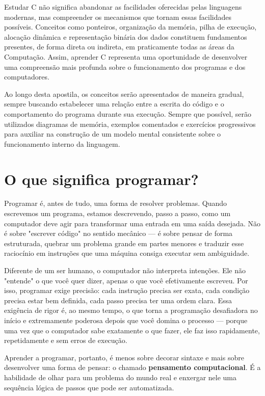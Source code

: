 \documentclass[12pt,a4paper,oneside]{extreport}
\begin{document}
Estudar C não significa abandonar as facilidades oferecidas pelas linguagens modernas, mas compreender os mecanismos que tornam essas facilidades possíveis. 
Conceitos como ponteiros, organização da memória, pilha de execução, alocação dinâmica e 
representação binária dos dados constituem fundamentos presentes, de forma direta ou indireta, em praticamente todas as áreas da Computação. 
Assim, aprender C representa uma oportunidade de desenvolver uma compreensão mais profunda sobre o funcionamento dos programas e dos computadores.

Ao longo desta apostila, os conceitos serão apresentados de maneira gradual, sempre buscando estabelecer uma relação entre a escrita do código e o comportamento do programa durante sua execução. 
Sempre que possível, serão utilizados diagramas de memória, exemplos comentados e exercícios progressivos para auxiliar na construção de um modelo mental consistente sobre o funcionamento interno da linguagem.


\section{O que significa programar?}

Programar é, antes de tudo, uma forma de resolver problemas. Quando escrevemos um programa, estamos descrevendo, passo a passo, como um computador deve agir para transformar uma entrada em uma saída desejada. Não é sobre "escrever código" no sentido mecânico — é sobre pensar de forma estruturada, quebrar um problema grande em partes menores e traduzir esse raciocínio em instruções que uma máquina consiga executar sem ambiguidade.

Diferente de um ser humano, o computador não interpreta intenções. Ele não "entende" o que você quer dizer, apenas o que você efetivamente escreveu. Por isso, programar exige precisão: cada instrução precisa ser exata, cada condição precisa estar bem definida, cada passo precisa ter uma ordem clara. Essa exigência de rigor é, ao mesmo tempo, o que torna a programação desafiadora no início e extremamente poderosa depois que você domina o processo — porque uma vez que o computador sabe exatamente o que fazer, ele faz isso rapidamente, repetidamente e sem erros de execução.

Aprender a programar, portanto, é menos sobre decorar sintaxe e mais sobre desenvolver uma forma de pensar: o chamado \textbf{pensamento computacional}. É a habilidade de olhar para um problema do mundo real e enxergar nele uma sequência lógica de passos que pode ser automatizada.
\end{document}
